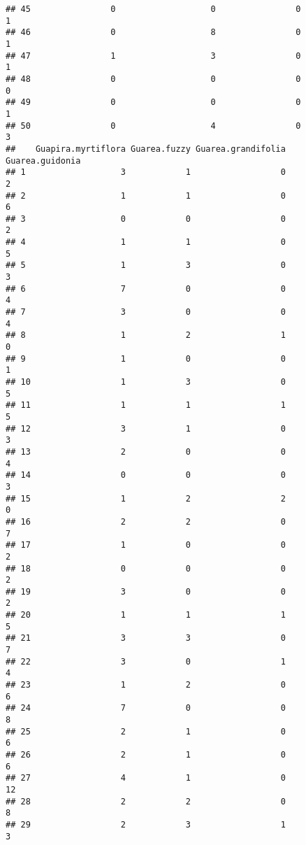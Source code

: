 \documentclass[
]{article}
\begin{document}
\begin{verbatim}
## 45                0                   0                0                1
## 46                0                   8                0                1
## 47                1                   3                0                1
## 48                0                   0                0                0
## 49                0                   0                0                1
## 50                0                   4                0                3
##    Guapira.myrtiflora Guarea.fuzzy Guarea.grandifolia Guarea.guidonia
## 1                   3            1                  0               2
## 2                   1            1                  0               6
## 3                   0            0                  0               2
## 4                   1            1                  0               5
## 5                   1            3                  0               3
## 6                   7            0                  0               4
## 7                   3            0                  0               4
## 8                   1            2                  1               0
## 9                   1            0                  0               1
## 10                  1            3                  0               5
## 11                  1            1                  1               5
## 12                  3            1                  0               3
## 13                  2            0                  0               4
## 14                  0            0                  0               3
## 15                  1            2                  2               0
## 16                  2            2                  0               7
## 17                  1            0                  0               2
## 18                  0            0                  0               2
## 19                  3            0                  0               2
## 20                  1            1                  1               5
## 21                  3            3                  0               7
## 22                  3            0                  1               4
## 23                  1            2                  0               6
## 24                  7            0                  0               8
## 25                  2            1                  0               6
## 26                  2            1                  0               6
## 27                  4            1                  0              12
## 28                  2            2                  0               8
## 29                  2            3                  1               3

\end{verbatim}
\end{document}
